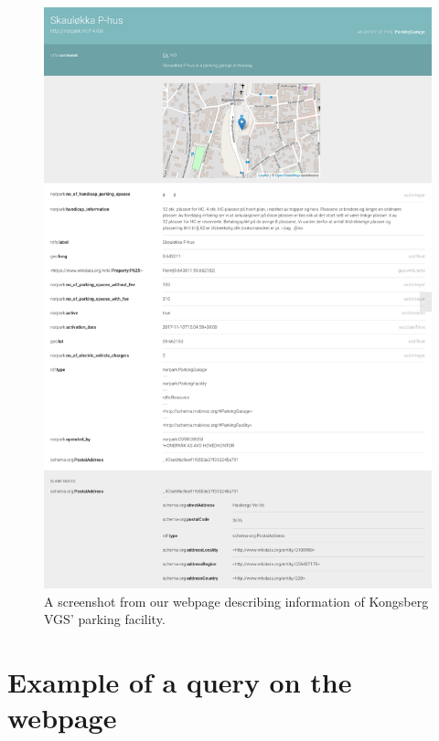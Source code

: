 \begin{figure}[H]
	\centering
	\includegraphics[scale=0.20]{figures/parking-place-screenshot.png}
	\caption{A screenshot from our webpage describing information of Kongsberg VGS' parking facility.}
\end{figure}

\chapter{Example of a query on the webpage}
\label{appendix:query}

